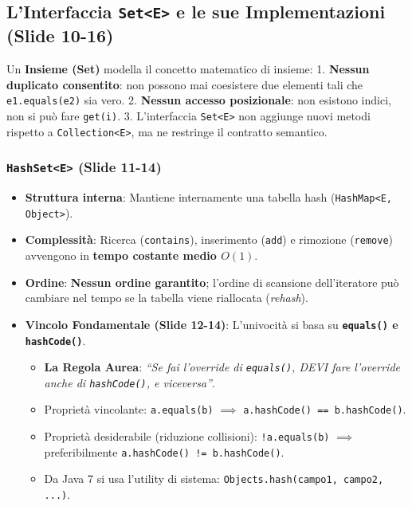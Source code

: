 \documentclass[11pt,a4paper,oneside]{report}
\newcommand{\passthrough}[1]{#1}
\providecommand{\tightlist}{\setlength{\itemsep}{0pt}\setlength{\parskip}{0pt}}
\begin{document}
\subsection{\texorpdfstring{L'Interfaccia
\texttt{Set\textless{}E\textgreater{}} e le sue Implementazioni (Slide
10-16)}{L'Interfaccia Set\textless E\textgreater{} e le sue Implementazioni (Slide 10-16)}}\label{chap15_linterfaccia-sete-e-le-sue-implementazioni-slide-10-16}

Un \textbf{Insieme (Set)} modella il concetto matematico di insieme: 1.
\textbf{Nessun duplicato consentito}: non possono mai coesistere due
elementi tali che \passthrough{\lstinline!e1.equals(e2)!} sia vero. 2.
\textbf{Nessun accesso posizionale}: non esistono indici, non si può
fare \passthrough{\lstinline!get(i)!}. 3. L'interfaccia
\passthrough{\lstinline!Set<E>!} non aggiunge nuovi metodi rispetto a
\passthrough{\lstinline!Collection<E>!}, ma ne restringe il contratto
semantico.

\subsubsection{\texorpdfstring{\texttt{HashSet\textless{}E\textgreater{}}
(Slide
11-14)}{HashSet\textless E\textgreater{} (Slide 11-14)}}\label{chap15_hashsete-slide-11-14}

\begin{itemize}
\tightlist
\item
  \textbf{Struttura interna}: Mantiene internamente una tabella hash
  (\passthrough{\lstinline!HashMap<E, Object>!}).
\item
  \textbf{Complessità}: Ricerca (\passthrough{\lstinline!contains!}),
  inserimento (\passthrough{\lstinline!add!}) e rimozione
  (\passthrough{\lstinline!remove!}) avvengono in \textbf{tempo costante
  medio \(O(1)\)}.
\item
  \textbf{Ordine}: \textbf{Nessun ordine garantito}; l'ordine di
  scansione dell'iteratore può cambiare nel tempo se la tabella viene
  riallocata (\emph{rehash}).
\item
  \textbf{Vincolo Fondamentale (Slide 12-14)}: L'univocità si basa su
  \textbf{\passthrough{\lstinline!equals()!} e
  \passthrough{\lstinline!hashCode()!}}.

  \begin{itemize}
  \tightlist
  \item
    \textbf{La Regola Aurea}: \emph{``Se fai l'override di
    \passthrough{\lstinline!equals()!}, DEVI fare l'override anche di
    \passthrough{\lstinline!hashCode()!}, e viceversa''}.
  \item
    Proprietà vincolante: \passthrough{\lstinline!a.equals(b)!}
    \(\implies\) \passthrough{\lstinline!a.hashCode() == b.hashCode()!}.
  \item
    Proprietà desiderabile (riduzione collisioni):
    \passthrough{\lstinline"!a.equals(b)"} \(\implies\) preferibilmente
    \passthrough{\lstinline"a.hashCode() != b.hashCode()"}.
  \item
    Da Java 7 si usa l'utility di sistema:
    \passthrough{\lstinline!Objects.hash(campo1, campo2, ...)!}.
  \end{itemize}
\end{itemize}
\end{document}
